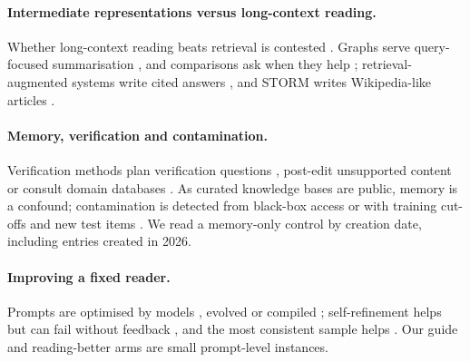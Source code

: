 \documentclass{article} %
\begin{document}
\paragraph{Intermediate representations versus long-context reading.}
Whether long-context reading beats retrieval is contested \citep{Li2024LongContext,Yu2024DefenseRag,liu2024lost,Zhang2024ChainAgents,Li2025LaraBenchmarking}. Graphs serve query-focused summarisation \citep{edge2024local}, and comparisons ask when they help \citep{han2025rag,xiang2025use}; retrieval-augmented systems write cited answers \citep{Lla2023PaperqaRetrievalaugmented,Asai2024OpenscholarSynthesizing,singh2025ai2}, and STORM writes Wikipedia-like articles \citep{shao2024assisting}.

\paragraph{Memory, verification and contamination.}
Verification methods plan verification questions \citep{dhuliawala2024chainofverification}, post-edit unsupported content \citep{Gao2022RarrResearching} or consult domain databases \citep{wang2025geneagent}. As curated knowledge bases are public, memory is a confound; contamination is detected from black-box access \citep{Shi2023DetectingPretraining,oren2024proving,golchin2024time,Golchin2025DataContamination} or with training cut-offs and new test items \citep{Roberts2023DataContamination,Jain2024LivecodebenchHolistic,White2024LivebenchChallenging}. We read a memory-only control by creation date, including entries created in 2026.

\paragraph{Improving a fixed reader.}
Prompts are optimised by models \citep{Zhou2022LargeLanguage,Pryzant2023AutomaticPrompt,Yang2023LargeLanguage}, evolved \citep{Guo2023EvopromptConnecting,Fernando2023PromptbreederSelfreferential,agrawal2026gepa} or compiled \citep{Khattab2023DspyCompiling,Opsahlong2024OptimizingInstructions}; self-refinement helps \citep{Madaan2023SelfrefineIterative} but can fail without feedback \citep{Huang2023LargeLanguage}, and the most consistent sample helps \citep{Wang2022SelfconsistencyImproves,Chen2023UniversalSelfconsistency}. Our guide and reading-better arms are small prompt-level instances.
\end{document}
